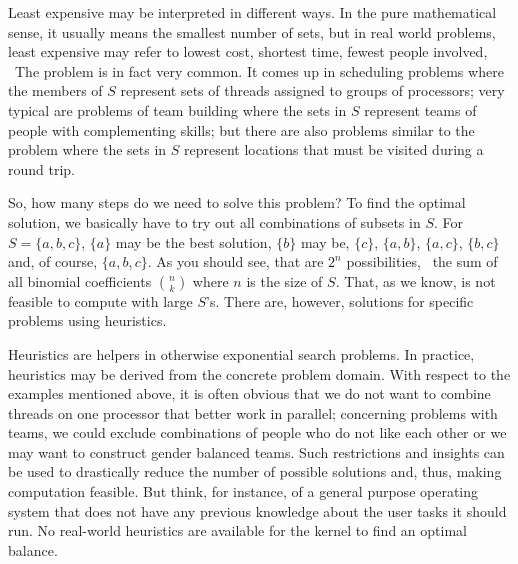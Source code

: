 \documentclass{scrreprt}
\begin{document}
Least expensive may be interpreted in different ways.
In the pure mathematical sense,
it usually means the smallest number of sets,
but in real world problems,
least expensive may refer to lowest cost,
shortest time, fewest people involved, \etc\
The problem is in fact very common.
It comes up in scheduling problems
where the members of $S$
represent sets of threads assigned
to groups of processors;
very typical are problems of
team building where the sets in $S$
represent teams of people with complementing skills;
but there are also problems 
similar to the 
problem where the sets in $S$ 
represent locations that must be visited 
during a round trip.

So, how many steps do we need to solve this problem?
To find the optimal solution,
we basically have to try out
all combinations of subsets in $S$.
For $S = \lbrace a,b,c\rbrace$,
$\lbrace a\rbrace$ may be the best solution,
$\lbrace b\rbrace$ may be,
$\lbrace c\rbrace$,
$\lbrace a,b\rbrace$,
$\lbrace a,c\rbrace$, 
$\lbrace b,c\rbrace$ and, of course,
$\lbrace a,b,c\rbrace$.
As you should see,
that are $2^n$ possibilities,
\ie\ the sum of all binomial coefficients $\binom{n}{k}$
where $n$ is the size of $S$.
That, as we know, is not feasible to compute
with large $S$'s.
There are, however, solutions for specific problems
using heuristics.

Heuristics are helpers in otherwise exponential
search problems.
In practice, heuristics may be derived from the concrete
problem domain.
With respect to the examples mentioned above,
it is often obvious that we do 
not want to combine threads on one processor
that better work in parallel;
concerning problems with teams,
we could exclude combinations of people
who do not like each other
or we may want to construct gender balanced teams. 
Such restrictions and insights
can be used to drastically reduce 
the number of possible solutions
and, thus, making computation feasible.
But think, for instance,
of a general purpose operating system
that does not have any previous knowledge
about the user tasks it should run.
No real-world heuristics are available
for the kernel to find an optimal balance.
\end{document}
